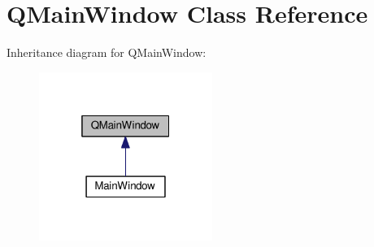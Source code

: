 \hypertarget{classGUI_1_1QMainWindow}{}\section{Q\+Main\+Window Class Reference}
\label{classGUI_1_1QMainWindow}


Inheritance diagram for Q\+Main\+Window\+:
\nopagebreak
\begin{figure}[H]
\begin{center}
\leavevmode
\includegraphics[width=160pt]{classGUI_1_1QMainWindow__inherit__graph}
\end{center}
\end{figure}
